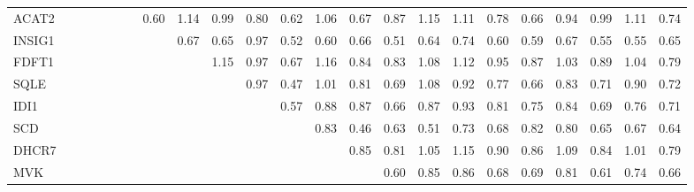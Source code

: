 \begin{longtable}{lrrrrrrrrrrrrrrrrrrrrrr}
ACAT2   &            &             &              &             &              &             &         0.60 &        1.14 &       0.99 &       0.80 &      0.62 &        1.06 &      0.67 &       0.87 &          1.15 &      1.11 &       0.78 &       0.66 &        0.94 &      0.99 &      1.11 &         0.74 \\
INSIG1  &            &             &              &             &              &             &              &        0.67 &       0.65 &       0.97 &      0.52 &        0.60 &      0.66 &       0.51 &          0.64 &      0.74 &       0.60 &       0.59 &        0.67 &      0.55 &      0.55 &         0.65 \\
FDFT1   &            &             &              &             &              &             &              &             &       1.15 &       0.97 &      0.67 &        1.16 &      0.84 &       0.83 &          1.08 &      1.12 &       0.95 &       0.87 &        1.03 &      0.89 &      1.04 &         0.79 \\
SQLE    &            &             &              &             &              &             &              &             &            &       0.97 &      0.47 &        1.01 &      0.81 &       0.69 &          1.08 &      0.92 &       0.77 &       0.66 &        0.83 &      0.71 &      0.90 &         0.72 \\
IDI1    &            &             &              &             &              &             &              &             &            &            &      0.57 &        0.88 &      0.87 &       0.66 &          0.87 &      0.93 &       0.81 &       0.75 &        0.84 &      0.69 &      0.76 &         0.71 \\
SCD     &            &             &              &             &              &             &              &             &            &            &           &        0.83 &      0.46 &       0.63 &          0.51 &      0.73 &       0.68 &       0.82 &        0.80 &      0.65 &      0.67 &         0.64 \\
DHCR7   &            &             &              &             &              &             &              &             &            &            &           &             &      0.85 &       0.81 &          1.05 &      1.15 &       0.90 &       0.86 &        1.09 &      0.84 &      1.01 &         0.79 \\
MVK     &            &             &              &             &              &             &              &             &            &            &           &             &           &       0.60 &          0.85 &      0.86 &       0.68 &       0.69 &        0.81 &      0.61 &      0.74 &         0.66 \\

\end{longtable}
